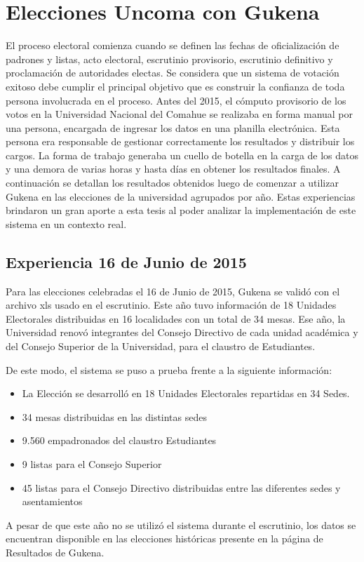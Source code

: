 \chapter{Elecciones Uncoma con Gukena}
\label{Gukena2}
El proceso electoral comienza cuando se definen las fechas de oficialización de padrones y listas, acto electoral, escrutinio provisorio, escrutinio definitivo y proclamación de autoridades electas. Se considera que un sistema de votación exitoso debe cumplir el principal objetivo que es construir la confianza de toda persona involucrada en el proceso. 
Antes del 2015, el cómputo provisorio de los votos en la Universidad Nacional del Comahue se realizaba en forma manual por una persona, encargada de ingresar los datos en una planilla electrónica. Esta persona era responsable de gestionar correctamente los resultados y distribuir los cargos. La forma de trabajo generaba un cuello de botella en la carga de los datos y una demora de varias horas y hasta días en obtener los resultados finales. \newline
A continuación se detallan los resultados obtenidos luego de comenzar a utilizar Gukena en las elecciones de la universidad agrupados por año. Estas experiencias brindaron un gran aporte a esta tesis al poder analizar la implementación de este sistema en un contexto real.

\section{Experiencia 16 de Junio de 2015}
Para las elecciones celebradas el 16 de Junio de 2015, Gukena se validó con el archivo xls usado en el escrutinio. Este año tuvo información de 18 Unidades Electorales distribuidas en 16 localidades con un total de 34 mesas. 
Ese año, la Universidad renovó integrantes del Consejo Directivo de cada unidad académica y del Consejo Superior de la Universidad, para el claustro de Estudiantes.

De este modo, el sistema se puso a prueba frente a la siguiente información:
\begin{itemize}
    \item La Elección se desarrolló en 18 Unidades Electorales repartidas en 34 Sedes.
    \item 34 mesas distribuidas en las distintas sedes
    \item 9.560 empadronados del claustro Estudiantes
    \item 9 listas para el Consejo Superior
    \item 45 listas para el Consejo Directivo distribuidas entre las diferentes sedes y asentamientos
\end{itemize}
A pesar de que este año no se utilizó el sistema durante el escrutinio, los datos se encuentran disponible en las elecciones históricas presente en la página de Resultados de Gukena.

